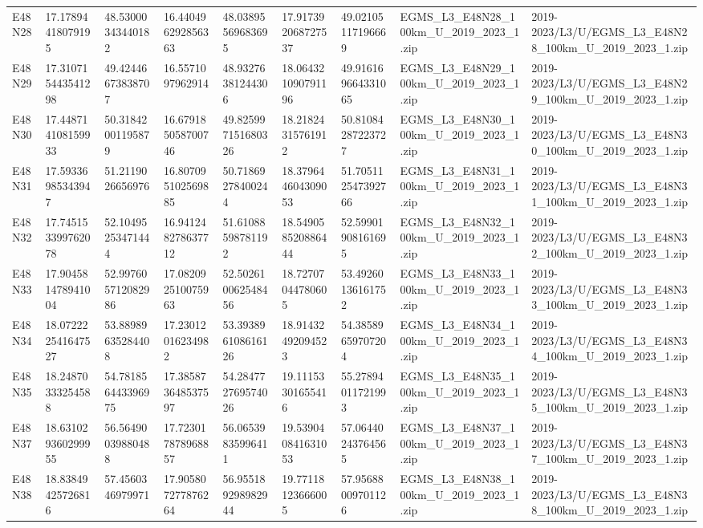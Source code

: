 \begin{landscape}
\begin{longtable}{lllllllll}
E48N28 & 17.17894418079195 & 48.53000343440182 & 16.440496292856363 & 48.03895569683695 & 17.917392068727537 & 49.02105117196669 & EGMS\_L3\_E48N28\_100km\_U\_2019\_2023\_1.zip & 2019-2023/L3/U/EGMS\_L3\_E48N28\_100km\_U\_2019\_2023\_1.zip \\
E48N29 & 17.310715443541298 & 49.42446673838707 & 16.5571097962914 & 48.93276381244306 & 18.064321090791196 & 49.916169664331065 & EGMS\_L3\_E48N29\_100km\_U\_2019\_2023\_1.zip & 2019-2023/L3/U/EGMS\_L3\_E48N29\_100km\_U\_2019\_2023\_1.zip \\
E48N30 & 17.448714108159933 & 50.31842001195879 & 16.679185058700746 & 49.825997151680326 & 18.21824315761912 & 50.81084287223727 & EGMS\_L3\_E48N30\_100km\_U\_2019\_2023\_1.zip & 2019-2023/L3/U/EGMS\_L3\_E48N30\_100km\_U\_2019\_2023\_1.zip \\
E48N31 & 17.59336985343947 & 51.2119026656976 & 16.807095102569885 & 50.71869278400244 & 18.379644604309053 & 51.705112547392766 & EGMS\_L3\_E48N31\_100km\_U\_2019\_2023\_1.zip & 2019-2023/L3/U/EGMS\_L3\_E48N31\_100km\_U\_2019\_2023\_1.zip \\
E48N32 & 17.745153399762078 & 52.10495253471444 & 16.941248278637712 & 51.61088598781192 & 18.549058520886444 & 52.59901908161695 & EGMS\_L3\_E48N32\_100km\_U\_2019\_2023\_1.zip & 2019-2023/L3/U/EGMS\_L3\_E48N32\_100km\_U\_2019\_2023\_1.zip \\
E48N33 & 17.904581478941004 & 52.997605712082986 & 17.082092510075963 & 52.502610062548456 & 18.72707044780605 & 53.49260136161752 & EGMS\_L3\_E48N33\_100km\_U\_2019\_2023\_1.zip & 2019-2023/L3/U/EGMS\_L3\_E48N33\_100km\_U\_2019\_2023\_1.zip \\
E48N34 & 18.072222541647527 & 53.88989635284408 & 17.23012016234982 & 53.393896108616126 & 18.91432492094523 & 54.38589659707204 & EGMS\_L3\_E48N34\_100km\_U\_2019\_2023\_1.zip & 2019-2023/L3/U/EGMS\_L3\_E48N34\_100km\_U\_2019\_2023\_1.zip \\
E48N35 & 18.24870333254588 & 54.781856443396975 & 17.385873648537597 & 54.284772769574026 & 19.11153301655416 & 55.27894011721993 & EGMS\_L3\_E48N35\_100km\_U\_2019\_2023\_1.zip & 2019-2023/L3/U/EGMS\_L3\_E48N35\_100km\_U\_2019\_2023\_1.zip \\
E48N37 & 18.631029360299955 & 56.56490039880488 & 17.723017878968857 & 56.06539835996411 & 19.539040841631053 & 57.06440243764565 & EGMS\_L3\_E48N37\_100km\_U\_2019\_2023\_1.zip & 2019-2023/L3/U/EGMS\_L3\_E48N37\_100km\_U\_2019\_2023\_1.zip \\
E48N38 & 18.83849425726816 & 57.4560346979971 & 17.905807277876264 & 56.955189298982944 & 19.77118123666005 & 57.95688009701126 & EGMS\_L3\_E48N38\_100km\_U\_2019\_2023\_1.zip & 2019-2023/L3/U/EGMS\_L3\_E48N38\_100km\_U\_2019\_2023\_1.zip \\

\end{longtable}
\end{landscape}
